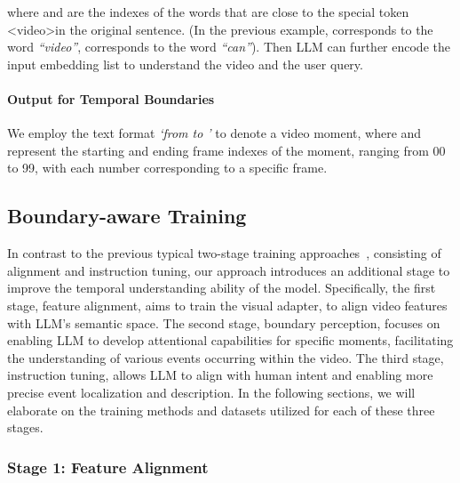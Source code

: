 \documentclass[10pt,twocolumn,letterpaper]{article}
\begin{document}
where  and  are the indexes of the words that are close to the special token \textless video\textgreater in the original sentence. (In the previous example,  corresponds to the word \textit{``video''},  corresponds to the word \textit{``can''}). Then LLM can further encode the input embedding list  to understand the video and the user query.

\paragraph{Output for Temporal Boundaries} We employ the text format \textit{`from  to '} to denote a video moment, where  and  represent the starting and ending frame indexes of the moment, ranging from 00 to 99, with each number corresponding to a specific frame. 



\subsection{Boundary-aware Training}

In contrast to the previous typical two-stage training approaches~\cite{li2023videochat, zhang2023videollama, maaz2023videochatgpt}, consisting of alignment and instruction tuning, our approach introduces an additional stage to improve the temporal understanding ability of the model. Specifically, the first stage, feature alignment, aims to train the visual adapter, to align video features with LLM's semantic space. The second stage, boundary perception, focuses on enabling LLM to develop attentional capabilities for specific moments, facilitating the understanding of various events occurring within the video. The third stage, instruction tuning, allows LLM to align with human intent and enabling more precise event localization and description. In the following sections, we will elaborate on the training methods and datasets utilized for each of these three stages.


\subsubsection{Stage 1: Feature Alignment}
\end{document}
